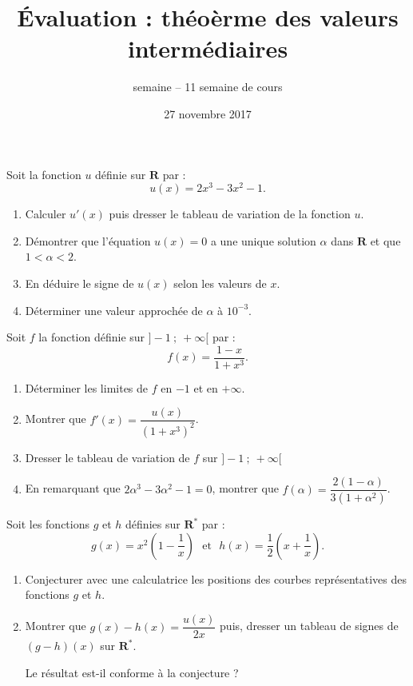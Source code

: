 \documentclass[a4paper,12pt,frenchb]{article}
\title{Évaluation : théoèrme des valeurs intermédiaires}
\author{semaine \no{48} -- 11\up{ième} semaine de cours}
\date{27 novembre 2017}
\begin{document}
\maketitle

\thispagestyle{fancy}

\begin{question}[subtitle={TVI}]


  Soit la fonction $u$ définie sur $\mathbf{R}$ par :
\[u(x)=2x^3-3x^2-1.\]
\begin{enumerate}
\item Calculer $u'(x)$ puis dresser le tableau de variation de la fonction $u$.
\item Démontrer que l'équation $u(x)=0$ a une unique solution $\alpha$ dans $\mathbf{R}$ et que $1<\alpha<2$.
\item En déduire le signe de $u(x)$ selon les valeurs de $x$.
\item Déterminer une valeur approchée de $\alpha$ à $10^{-3}$.
\end{enumerate}


Soit $f$ la fonction définie sur $]-1~;~+\infty[$ par :
\[f(x)=\dfrac{1-x}{1+x^3}.\]
\begin{enumerate}
  \item Déterminer les limites de $f$ en $-1$ et en $+\infty$.
  \item Montrer que $f'(x)=\dfrac{u(x)}{\left(1+x^3\right)^2}$.
  \item Dresser le tableau de variation de $f$ sur $]-1~;~+\infty[$
  \item En remarquant que $2\alpha^3-3\alpha^2-1=0$, montrer que $f(\alpha)=\dfrac{2(1-\alpha)}{3(1+\alpha^2)}$.
\end{enumerate}


Soit les fonctions $g$ et $h$ définies sur  $\mathbf{R}^*$ par :
\[g(x)=x^2\left(1-\dfrac{1}{x}\right) \text{~~et~~} h(x)=\dfrac{1}{2}\left(x+\dfrac{1}{x}\right).\]
\begin{enumerate}
  \item Conjecturer avec une calculatrice les positions des courbes  représentatives des fonctions $g$ et $h$.
  \item Montrer que $g(x)-h(x)=\dfrac{u(x)}{2x}$ puis, dresser un tableau de signes de $(g-h)(x)$ sur $\mathbf{R}^*$.\par
Le résultat est-il  conforme à la conjecture ?
\end{enumerate}
\end{question}
\end{document}
